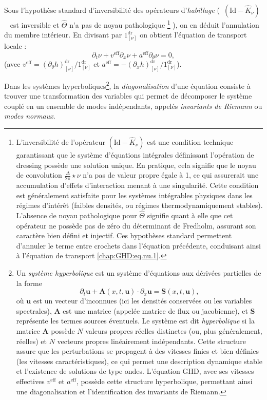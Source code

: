 Sous l'hypothèse standard d'inversibilité des opérateurs d'\emph{habillage} \Big (\ie\ \(\left(\mathrm{Id} - \widehat{K}_{\nu}\right)\)~ est inversible et \(\widehat{\Theta}\) n'a pas de noyau pathologique 
\footnote{
L'inversibilité de l'opérateur \(\left(\mathrm{Id} - \widehat{K}_{\nu}\right)\) est une condition technique garantissant que le système d'équations intégrales définissant l'opération de dressing possède une solution unique. En pratique, cela signifie que le noyau de convolution \(\tfrac{\Delta}{2\pi}\star\nu\) n'a pas de valeur propre égale à 1, ce qui assurerait une accumulation d'effets d'interaction menant à une singularité. Cette condition est généralement satisfaite pour les systèmes intégrables physiques dans les régimes d'intérêt (faibles densités, ou régimes thermodynamiquement stables). L'absence de noyau pathologique pour \(\widehat{\Theta}\) signifie quant à elle que cet opérateur ne possède pas de zéro du déterminant de Fredholm, assurant son caractère bien défini et injectif. Ces hypothèses standard permettent d'annuler le terme entre crochets dans l'équation précédente, conduisant ainsi à l'équation de transport \eqref{chap:GHD:eq.nu.1}.
} 
\Big ), on en déduit l'annulation du membre intérieur. En divisant par \(1^{\mathrm{dr}}_{[\nu]}\) on obtient l'équation de transport locale :
\begin{equation}\label{chap:GHD:eq.nu.1}
	\partial_t\nu + v^{\mathrm{eff}}\partial_x\nu + a^{\mathrm{eff}}\partial_\theta\nu = 0,
\end{equation}
(avec \(v^{\mathrm{eff}}=(\partial_\theta h)^{\mathrm{dr}}_{[\nu]}/1^{\mathrm{dr}}_{[\nu]}\) et \(a^{\mathrm{eff}}=-(\partial_x h)^{\mathrm{dr}}_{[\nu]}/1^{\mathrm{dr}}_{[\nu]}\)).  
  

\medskip

Dans les systèmes hyperboliques\footnote{
Un \emph{système hyperbolique} est un système d'équations aux dérivées partielles de la forme
\[
\partial_t \mathbf{u} + \mathbf{A}(x,t,\mathbf{u}) \cdot \partial_x \mathbf{u} = \mathbf{S}(x,t,\mathbf{u}),
\]
où $\mathbf{u}$ est un vecteur d'inconnues (ici les densités conservées ou les variables spectrales), $\mathbf{A}$ est une matrice (appelée matrice de flux ou jacobienne), et $\mathbf{S}$ représente les termes sources éventuels. Le système est dit \emph{hyperbolique} si la matrice $\mathbf{A}$ possède $N$ valeurs propres réelles distinctes (ou, plus généralement, réelles) et $N$ vecteurs propres linéairement indépendants. Cette structure assure que les perturbations se propagent à des vitesses finies et bien définies (les vitesses caractéristiques), ce qui permet une description dynamique stable et l'existence de solutions de type ondes. L'équation \gls{GHD}, avec ses vitesses effectives $v^{\mathrm{eff}}$ et $a^{\mathrm{eff}}$, possède cette structure hyperbolique, permettant ainsi une diagonalisation et l'identification des invariants de Riemann.
}, la \emph{diagonalisation} d'une équation consiste à trouver une transformation des variables qui permet de décomposer le système couplé en un ensemble de modes indépendants, appelés \emph{invariants de Riemann} ou \emph{modes normaux}. 


